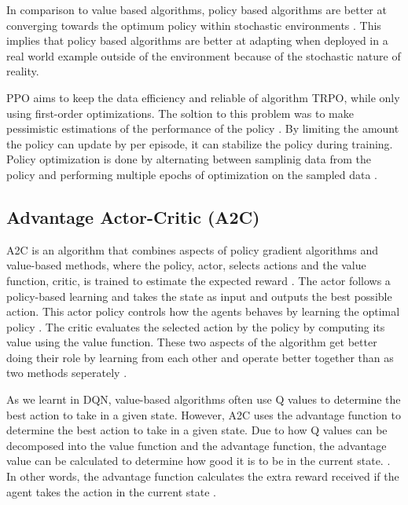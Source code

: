 In comparison to value based algorithms, policy based algorithms are better at converging towards the optimum policy within stochastic environments \cite{mnih2015human}. This implies that policy based algorithms are better at adapting when deployed in a real world example outside of the environment because of the stochastic nature of reality. 

PPO aims to keep the data efficiency and reliable of algorithm TRPO, while only using first-order optimizations. The soltion to this problem was to make pessimistic estimations of the performance of the policy \cite{schulman2017proximal}. By limiting the amount the policy can update by per episode, it can stabilize the policy during training. Policy optimization is done by alternating between samplinig data from the policy and performing multiple epochs of optimization on the sampled data \cite{schulman2017proximal}. 

\subsection{Advantage Actor-Critic (A2C)}

A2C is an algorithm that combines aspects of policy gradient algorithms and value-based methods, where the policy, actor, selects actions and the value function, critic, is trained to estimate the expected reward \cite{mnih2013playing}. The actor follows a policy-based learning and takes the state as input and outputs the best possible action. This actor policy controls how the agents behaves by learning the optimal policy \cite{SergiosKaragiannakos2018}. The critic evaluates the selected action by the policy by computing its value using the value function. These two aspects of the algorithm get better doing their role by learning from each other and operate better together than as two methods seperately \cite{SergiosKaragiannakos2018}. 

As we learnt in DQN, value-based algorithms often use Q values to determine the best action to take in a given state. However, A2C uses the advantage function to determine the best action to take in a given state. Due to how Q values can be decomposed into the value function and the advantage function, the advantage value can be calculated to determine how good it is to be in the current state. \cite{SergiosKaragiannakos2018}. In other words, the advantage function calculates the extra reward received if the agent takes the action in the current state \cite{ThomasSimonini2022A2C}.

